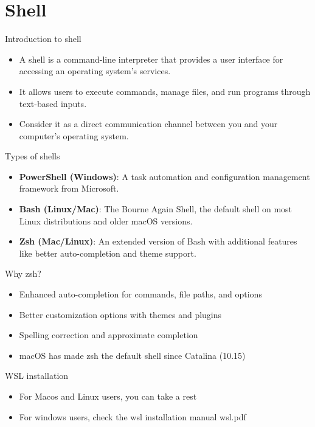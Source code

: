 \section{Shell}

\begin{frame}[fragile]{Introduction to shell}
	\begin{itemize}
		\item A shell is a command-line interpreter that provides a user interface for accessing an operating system's services.
		\item It allows users to execute commands, manage files, and run programs through text-based inputs.
		\item Consider it as a direct communication channel between you and your computer's operating system.
	\end{itemize}
\end{frame}

\begin{frame}[fragile]{Types of shells}
	\begin{itemize}
		\item \textbf{PowerShell (Windows)}: A task automation and configuration management framework from Microsoft.
		\item \textbf{Bash (Linux/Mac)}: The Bourne Again Shell, the default shell on most Linux distributions and older macOS versions.
		\item \textbf{Zsh (Mac/Linux)}: An extended version of Bash with additional features like better auto-completion and theme support.
	\end{itemize}
\end{frame}

\begin{frame}[fragile]{Why zsh?}
	\begin{itemize}
		\item Enhanced auto-completion for commands, file paths, and options
		\item Better customization options with themes and plugins
		\item Spelling correction and approximate completion
		\item macOS has made zsh the default shell since Catalina (10.15)
	\end{itemize}
\end{frame}

\begin{frame}[fragile]{WSL installation}
	\begin{itemize}
		\item For Macos and Linux users, you can take a rest
		\item For windows users, check the wsl installation manual wsl.pdf
	\end{itemize}
\end{frame}

